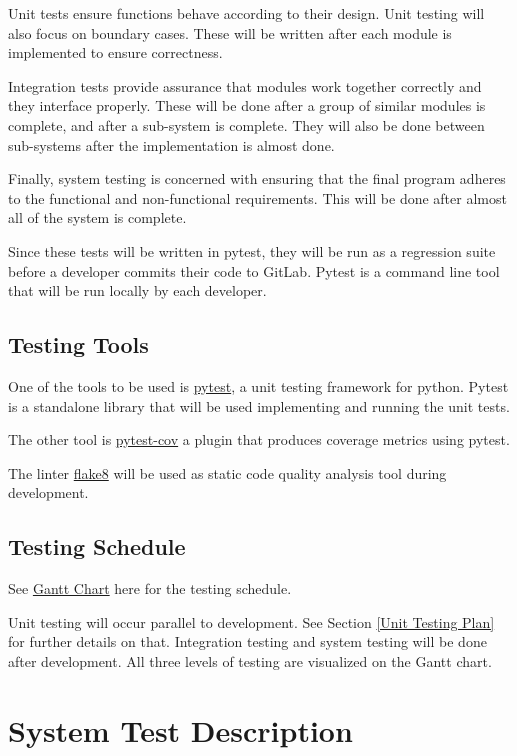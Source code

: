 \documentclass[12pt, titlepage]{article}
\begin{document}
Unit tests ensure functions behave according to their design. Unit testing will also focus on boundary cases. These will be written after each module is implemented to ensure correctness.

Integration tests provide assurance that modules work together correctly and they interface properly. These will be done after a group of similar modules is complete, and after a sub-system is complete. They will also be done between sub-systems after the implementation is almost done.

Finally, system testing is concerned with ensuring that the final program adheres to the functional and non-functional requirements. This will be done after almost all of the system is complete.

Since these tests will be written in pytest, they will be run as a regression suite before a developer commits their code to GitLab. Pytest is a command line tool that will be run locally by each developer.

\subsection{Testing Tools}

One of the tools to be used is \href{https://docs.pytest.org/en/latest/}{pytest}, a unit testing framework for python. Pytest is a standalone library that will be used implementing and running the unit tests.

The other tool is \href{https://pypi.org/project/pytest-cov/}{pytest-cov} a plugin that produces coverage metrics using pytest.

The linter \href{https://flake8.pycqa.org/en/latest/}{flake8} will be used as static code quality analysis tool during development.

\subsection{Testing Schedule}
		
See \href{https://gitlab.cas.mcmaster.ca/guinnesj/google-images-downloader/-/blob/master/ProjectSchedule/Gantt-Chart.pdf}{Gantt Chart} here for the testing schedule.

Unit testing will occur parallel to development. See Section \ref{Unit Testing Plan} for further details on that. Integration testing and system testing will be done after development. All three levels of testing are visualized on the Gantt chart.

\section{System Test Description}
\end{document}
